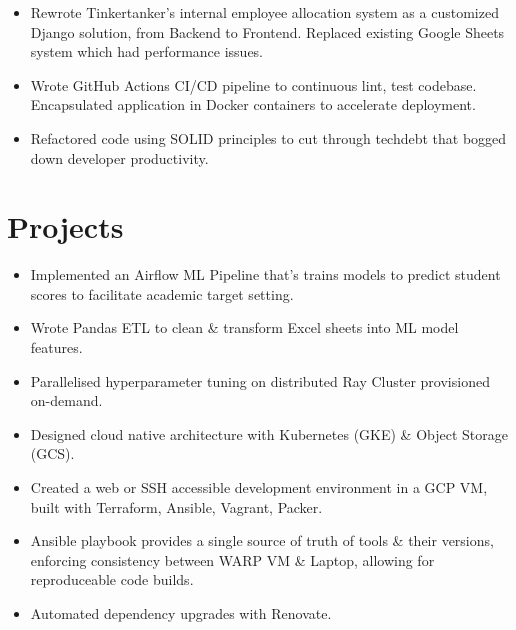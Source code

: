 \begin{itemize}
  \item Rewrote Tinkertanker's internal employee allocation system as 
    a customized Django solution, from Backend to Frontend. 
    Replaced existing Google Sheets system which had performance issues.
  \item Wrote GitHub Actions CI/CD pipeline to continuous lint, test codebase.
    Encapsulated application in Docker containers to accelerate deployment.
  \item Refactored code using SOLID principles to cut through techdebt that
    bogged down developer productivity.
\end{itemize}

\section{Projects}
\begin{itemize}
  \item Implemented an Airflow ML Pipeline that's trains models to predict student scores
    to facilitate academic target setting.
  \item Wrote Pandas ETL to clean \& transform Excel sheets into ML model features.
  \item Parallelised hyperparameter tuning on distributed Ray Cluster provisioned on-demand.
  \item Designed cloud native architecture with Kubernetes (GKE) \& Object Storage (GCS).
\end{itemize}

\begin{itemize}
  \item Created a web or SSH accessible development environment in a GCP VM,
    built with Terraform, Ansible, Vagrant, Packer.
  \item Ansible playbook provides a single source of truth of tools \& their versions,
    enforcing consistency between WARP VM \& Laptop, allowing for reproduceable code builds.
  \item Automated dependency upgrades with Renovate.
\end{itemize}
  
